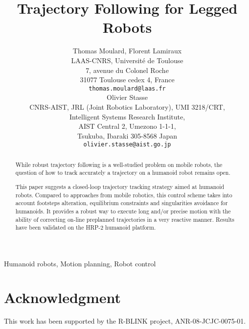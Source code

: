 \documentclass[conference,final]{IEEEtran}
\begin{document}
\title{Trajectory Following for Legged Robots}

\author{ \parbox{3 in}{\centering Thomas Moulard, Florent Lamiraux\\
    LAAS-CNRS, Universit\'e de Toulouse\\
    7, avenue du Colonel Roche\\
    31077 Toulouse cedex 4, France\\
    {\tt\small thomas.moulard@laas.fr}}
  \hspace*{0.5 in}
  \parbox{3 in}{ \centering Olivier Stasse\\
    CNRS-AIST, JRL (Joint Robotics Laboratory), UMI 3218/CRT,\\
    Intelligent Systems Research Institute,\\
    AIST Central 2, Umezono 1-1-1, \\
    Tsukuba, Ibaraki 305-8568 Japan\\
    {\tt\small olivier.stasse@aist.go.jp}}
}


\maketitle


\begin{abstract}
  While robust trajectory following is a well-studied problem on
  mobile robots, the question of how to track accurately a trajectory
  on a humanoid robot remains open.

  This paper suggests a closed-loop trajectory tracking strategy
  aimed at humanoid robots. Compared to approaches from mobile
  robotics, this control scheme takes into account footsteps
  alteration, equilibrium constraints and singularities avoidance for
  humanoids. It provides a robust way to execute long and/or precise
  motion with the ability of correcting on-line preplanned
  trajectories in a very reactive manner. Results have been validated
  on the HRP-2 humanoid platform.
\end{abstract}

\begin{IEEEkeywords}
  Humanoid robots, Motion planning, Robot control
\end{IEEEkeywords}

\IEEEpeerreviewmaketitle









\section*{Acknowledgment}

This work has been supported by the R-BLINK project,
ANR-08-JCJC-0075-01.



\end{document}
